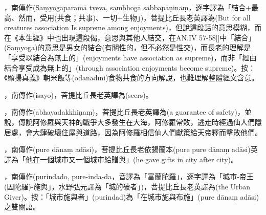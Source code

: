 \startitemgroup[noteitems]
\item{}，南傳作(Saṃyogaparamā tveva, sambhogā sabbapāṇinaṃ，逐字譯為「結合+最高、然而，受用(共食；共事)、一切+生物」)，菩提比丘長老英譯為(But for all creatures association Is supreme among enjoyments)，但說這段話的意思模糊，而在《本生經》中也出現這段偈，意思與其他人結交，在AN.IV 57-58[]中「結合」(Saṃyoga)的意思是男女的結合(有關性的，但不必然是性交)，而長老的理解是「享受以結合為無上的」(enjoyments have association as supreme)，而非「經由結合享受成為無上的」(through association enjoyments become supreme)。按：《顯揚真義》朝米飯等(odanādīni)食物共食的方向解說，也難理解整體經文含意。
\stopitemgroup

\startitemgroup[noteitems]
\item{}，南傳作(isayo)，菩提比丘長老英譯為(seers)。
\stopitemgroup

\startitemgroup[noteitems]
\item{}，南傳作(abhayadakkhiṇaṃ)，菩提比丘長老英譯為(a guarantee of safety)，並說，傳說阿修羅與天神的戰爭大多發生在大海，阿修羅常敗，逃走時經過仙人們隱居處，會大肆破壞住屋與道路，因為阿修羅相信仙人們獻策給天帝釋而擊敗他們。
\stopitemgroup

\startitemgroup[noteitems]
\item{}，南傳作(pure dānaṃ adāsi)，菩提比丘長老依錫蘭本(pure pure dānaṃ adāsi)英譯為「他在一個城市又一個城市給贈與」(he gave gifts in city after city)。
\stopitemgroup

\startitemgroup[noteitems]
\item{}，南傳作(purindado, pure-inda-da，音譯為「富蘭陀羅」，逐字譯為「城市-帝王(因陀羅)-施與」，水野弘元譯為「城的破者」)，菩提比丘長老英譯為(the Urban Giver)。按：「城市施與者」(purindad)為「在城市施與布施」(pure dānaṃ adāsi)之雙關語。
\stopitemgroup

